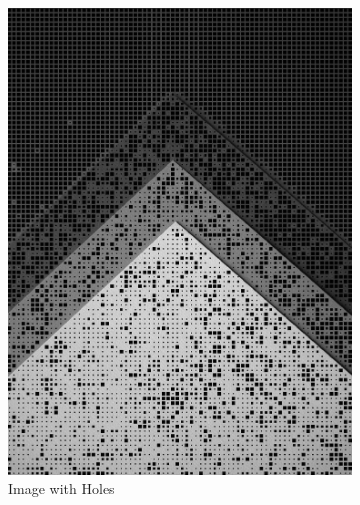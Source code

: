 \documentclass[landscape,a0paper,fontscale=0.5]{baposter} %
\begin{document}
\begin{poster}
{\begin{figure}[H]
\begin{subfigure}{0.2\textwidth}
		\includegraphics[scale=0.115]{3Pattern.jpg}
		\caption{Image with Holes} %
	\end{subfigure}
	\begin{subfigure}{0.2\textwidth} %

\end{subfigure}
\end{figure}}
\end{poster}
\end{document}
